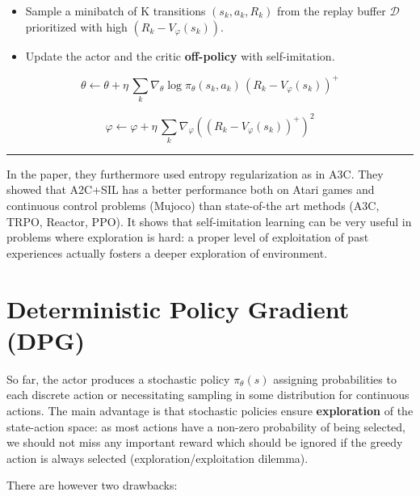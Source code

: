 \documentclass[
  letterpaper,
  DIV=11,
  numbers=noendperiod]{scrreprt}
\begin{document}
\begin{itemize}
\begin{itemize}
    \begin{itemize}
    \item
      Sample a minibatch of K transitions \((s_k, a_k, R_k)\) from the
      replay buffer \(\mathcal{D}\) prioritized with high
      \((R_k - V_\varphi(s_k))\).
    \item
      Update the actor and the critic \textbf{off-policy} with
      self-imitation.
    \end{itemize}

    \[
          \theta \leftarrow \theta + \eta \, \sum_k \nabla_\theta \log \pi_\theta(s_k, a_k) \, (R_k - V_\varphi(s_k))^+
      \]

    \[
          \varphi \leftarrow \varphi + \eta \, \sum_k \nabla_\varphi ((R_k - V_\varphi(s_k))^+)^2
      \]
  \end{itemize}
\end{itemize}

\begin{center}\rule{0.5\linewidth}{0.5pt}\end{center}

In the paper, they furthermore used entropy regularization as in A3C.
They showed that A2C+SIL has a better performance both on Atari games
and continuous control problems (Mujoco) than state-of-the art methods
(A3C, TRPO, Reactor, PPO). It shows that self-imitation learning can be
very useful in problems where exploration is hard: a proper level of
exploitation of past experiences actually fosters a deeper exploration
of environment.


\hypertarget{deterministic-policy-gradient-dpg}{%
\chapter{Deterministic Policy Gradient
(DPG)}\label{deterministic-policy-gradient-dpg}}

So far, the actor produces a stochastic policy \(\pi_\theta(s)\)
assigning probabilities to each discrete action or necessitating
sampling in some distribution for continuous actions. The main advantage
is that stochastic policies ensure \textbf{exploration} of the
state-action space: as most actions have a non-zero probability of being
selected, we should not miss any important reward which should be
ignored if the greedy action is always selected
(exploration/exploitation dilemma).

There are however two drawbacks:
\end{document}
